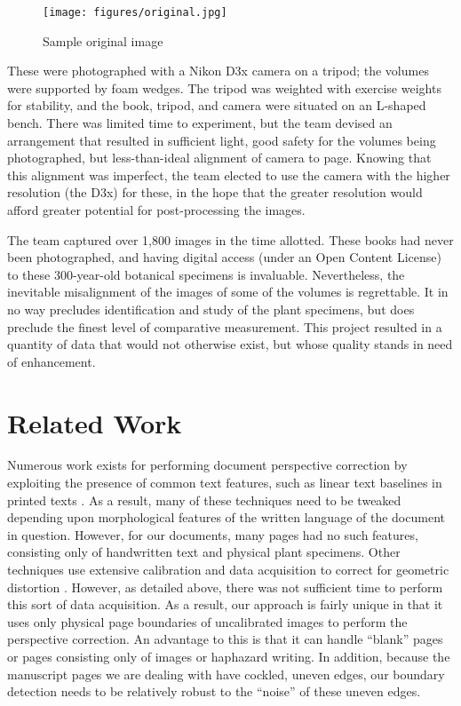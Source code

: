\documentclass[a4paper]{llncs}
\begin{document}
\begin{figure}[!htbm]
  \centering

  \texttt{[image: figures/original.jpg]}
  \caption{Sample original image}\label{fig:original}
\end{figure}

These were photographed with a Nikon D3x camera on a tripod; the volumes were supported by foam wedges. The tripod was weighted with exercise weights for stability, and the book, tripod, and camera were situated on an L-shaped bench. There was limited time to experiment, but the team devised an arrangement that resulted in sufficient light, good safety for the volumes being photographed, but less-than-ideal alignment of camera to page. Knowing that this alignment was imperfect, the team elected to use the camera with the higher resolution (the D3x) for these, in the hope that the greater resolution would afford greater potential for post-processing the images.

The team captured over 1,800 images in the time allotted. These books had never been photographed, and having digital access (under an Open Content License) to these 300-year-old botanical specimens is invaluable. Nevertheless, the inevitable misalignment of the images of some of the volumes is regrettable. It in no way precludes identification and study of the plant specimens, but does preclude the finest level of comparative measurement. This project resulted in a quantity of data that would not otherwise exist, but whose quality stands in need of enhancement.

\section{Related Work}

Numerous work exists for performing document perspective correction by exploiting the presence of
common text features, such as linear text baselines in printed texts
\cite{Clark:2001vj,Clark:2002wk,Clark:2003wf,Cao:2003bh,Lu:2003jy,Zhang:2005dy,Monnier:2005jj,Liang:2005hc,Ulges:2005ju,Ezaki:2005jc,Pollard:2005bp,Lu:2005ih,Avila:2005jx,Zhang:2008kj,JianLiang:2008ew,Bukhari:2009tc,Beusekom:2010dg,Luo:2011go,Rahnemoonfar:2011ux,Golpardaz:2011dz,Yang:2011dt}.
As a result, many of these techniques need to be tweaked depending upon morphological features of
the written language of the document in question.
However, for our documents,
many pages had no such features, consisting only of handwritten text and physical plant
specimens.
Other techniques use extensive calibration and data acquisition to correct for geometric distortion 
\cite{Pilu:vr,Brown:2001td,Brown:2004vl,Brown:2005uy,Brown:2007ti,LiZhang:2008bp}.
However, as detailed above, there was not sufficient time to perform this sort of data acquisition.
As a result, our approach is fairly unique in that it uses only physical page boundaries of uncalibrated images to
perform the perspective correction. An advantage to this is that it can handle “blank” pages or pages
consisting only of images or haphazard writing. In addition, because the manuscript pages we are dealing with have
cockled, uneven edges, our boundary detection needs to be relatively robust to the “noise” of these uneven edges.
\end{document}
